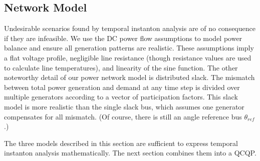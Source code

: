 \documentclass[journal,twoside]{IEEEtran}
\begin{document}
%

\subsection{Network Model}\label{sec:models-network}
Undesirable scenarios found by temporal instanton analysis are of no consequence if they are infeasible. We use the DC power flow assumptions to model power balance and ensure all generation patterns are realistic. These assumptions imply a flat voltage profile, negligible line resistance (though resistance values are used to calculate line temperatures), and linearity of the sine function. The other noteworthy detail of our power network model is distributed slack. The mismatch between total power generation and demand at any time step is divided over multiple generators according to a vector of participation factors. This slack model is more realistic than the single slack bus, which assumes one generator compensates for all mismatch. (Of course, there is still an angle reference bus $\theta_{ref}$.)

The three models described in this section are sufficient to express temporal instanton analysis mathematically. The next section combines them into a QCQP.
\end{document}
